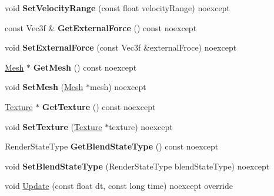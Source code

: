 \begin{DoxyCompactItemize}
void {\bfseries Set\+Velocity\+Range} (const float velocity\+Range) noexcept
\item 
\mbox{\label{class_blade_1_1_emitter_component_a8a6ee4e0d18fa38dd1863063ba96801f}} 
const Vec3f \& {\bfseries Get\+External\+Force} () const noexcept
\item 
\mbox{\label{class_blade_1_1_emitter_component_a81753284eebd9a74f2e5792650f5c2cc}} 
void {\bfseries Set\+External\+Force} (const Vec3f \&external\+Froce) noexcept
\item 
\mbox{\label{class_blade_1_1_emitter_component_a82f45a55cd61b25444a9b94cf4297a09}} 
\hyperlink{class_blade_1_1_mesh}{Mesh} $\ast$ {\bfseries Get\+Mesh} () const noexcept
\item 
\mbox{\label{class_blade_1_1_emitter_component_ad77eb47992f071a3ca28d8763d89e566}} 
void {\bfseries Set\+Mesh} (\hyperlink{class_blade_1_1_mesh}{Mesh} $\ast$mesh) noexcept
\item 
\mbox{\label{class_blade_1_1_emitter_component_acb800175126170cb9073fb8767b05be1}} 
\hyperlink{class_blade_1_1_texture}{Texture} $\ast$ {\bfseries Get\+Texture} () const noexcept
\item 
\mbox{\label{class_blade_1_1_emitter_component_ad457ad5f5355942a66d0b7a324d8b00f}} 
void {\bfseries Set\+Texture} (\hyperlink{class_blade_1_1_texture}{Texture} $\ast$texture) noexcept
\item 
\mbox{\label{class_blade_1_1_emitter_component_afe6632e7c3a429f9680de72118ec1de7}} 
Render\+State\+Type {\bfseries Get\+Blend\+State\+Type} () const noexcept
\item 
\mbox{\label{class_blade_1_1_emitter_component_a685000643bd3390b5b3bc613e0d621e3}} 
void {\bfseries Set\+Blend\+State\+Type} (Render\+State\+Type blend\+State\+Type) noexcept
\item 
void \hyperlink{class_blade_1_1_emitter_component_ac9fe8dec74fec5c575b960cc9d1411ac}{Update} (const float dt, const long time) noexcept override

\end{DoxyCompactItemize}
